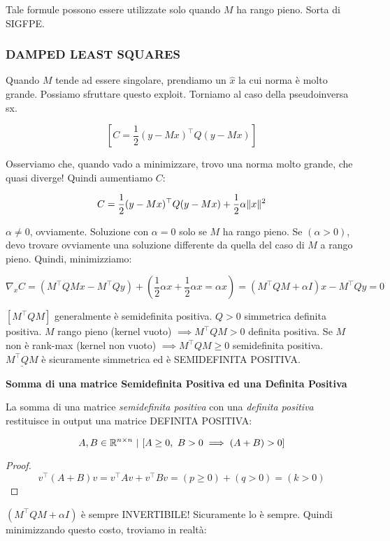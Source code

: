 Tale formule possono essere utilizzate solo quando $M$ ha rango pieno. Sorta di SIGFPE.

\subsubsection{DAMPED LEAST SQUARES}

Quando $M$ tende ad essere singolare, prendiamo un $\hat{x}$ la cui norma è molto grande. Possiamo sfruttare questo exploit. Torniamo al caso della pseudoinversa sx.

\[
	[C = \frac{1}{2}(y-Mx)^\top Q(y-Mx)]
\]

Osserviamo che, quando vado a minimizzare, trovo una norma molto grande, che quasi diverge! Quindi aumentiamo $C$:

\[	
	C = \frac{1}{2}(y-Mx)^\top Q(y-Mx) + \frac{1}{2}\alpha\lVert x\rVert^2
\]

$\alpha\neq 0$, ovviamente. Soluzione con $\alpha=0$ solo se $M$ ha rango pieno. Se $(\alpha>0)$, devo trovare ovviamente una soluzione differente da quella del caso di $M$ a rango pieno. Quindi, minimizziamo:

\[
	\nabla_x{C} = (M^\top QMx - M^\top Qy) + (\frac{1}{2}\alpha x + \frac{1}{2}\alpha x = \alpha x) = (M^\top QM + \alpha I)x-M^\top Qy = 0
\]

$[M^\top QM]$ generalmente è semidefinita positiva. $Q>0$ simmetrica definita positiva. $M$ rango pieno (kernel vuoto) $\implies M^\top QM > 0$ definita positiva. Se $M$ non è rank-max (kernel non vuoto) $\implies M^\top QM \geq 0$ semidefinita positiva. $\underline{M^\top QM}$ è sicuramente simmetrica ed è SEMIDEFINITA POSITIVA.

\begin{thrm}{\textbf{Somma di una matrice Semidefinita Positiva ed una Definita Positiva}}

La somma di una matrice \textit{semidefinita positiva} con una \textit{definita positiva} restituisce in output una matrice DEFINITA POSITIVA:

\[
	A,B\in\R^{n\times n}\ |\ [A\geq 0,\ B>0 \implies (A+B)>0]
\]

\end{thrm}

\begin{proof}

\[
	v^\top(A+B)v = v^\top Av + v^\top Bv = (p\geq 0) + (q > 0) = (k>0)
\]

\end{proof}

$(M^\top QM + \alpha I)$ è sempre INVERTIBILE! Sicuramente lo è sempre. Quindi minimizzando questo costo, troviamo in realtà:

